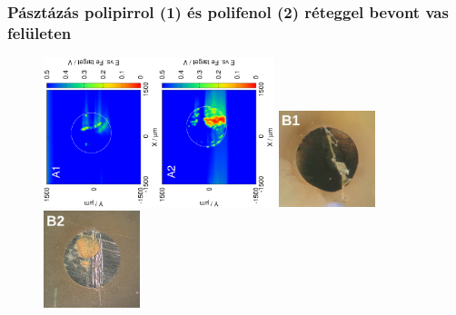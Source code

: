\documentclass{beamer}
\begin{document}
\begin{frame}
\frametitle{Pásztázás polipirrol (1) és polifenol (2) réteggel bevont vas felületen}
\begin{figure}
\centering
\includegraphics[trim = 15mm 30mm 0mm 15mm, clip, width=0.3\textwidth, angle=-90]{18012501_deconvoluted.eps}\hspace{0.6cm}\includegraphics[trim = 15mm 30mm 0mm 15mm, clip, width=0.3\textwidth, angle=-90]{18012406_deconvoluted.eps}
\includegraphics[width=0.25\textwidth]{ppyrrole_cut.jpg}\hspace{2cm}\includegraphics[width=0.25\textwidth]{pphenol_cut.jpg}
\end{figure}
\end{frame}
\end{document}
